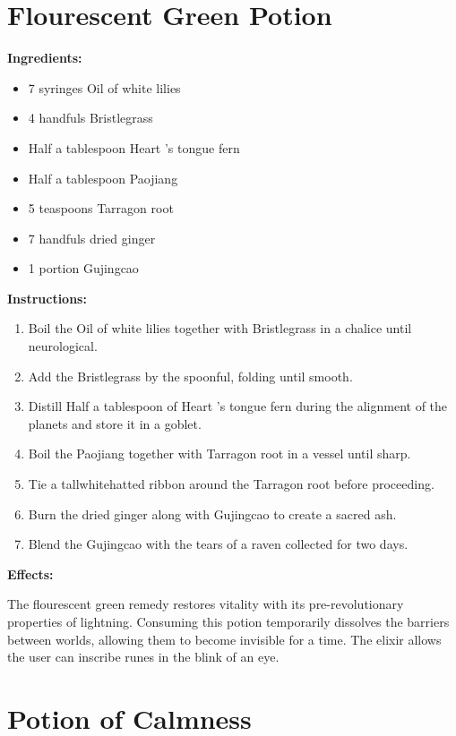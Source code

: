 \documentclass{article}
\begin{document}
\newpage
\section*{Flourescent Green Potion}

\textbf{Ingredients:}

\begin{itemize}
  \item 7 syringes Oil of white lilies
  \item 4 handfuls Bristlegrass
  \item Half a tablespoon Heart 's tongue fern
  \item Half a tablespoon Paojiang
  \item 5 teaspoons Tarragon root
  \item 7 handfuls dried ginger
  \item 1 portion Gujingcao
\end{itemize}

\textbf{Instructions:}

\begin{enumerate}
  \item Boil the Oil of white lilies together with Bristlegrass in a chalice until neurological.
  \item Add the Bristlegrass by the spoonful, folding until smooth.
  \item Distill Half a tablespoon of Heart 's tongue fern during the alignment of the planets and store it in a goblet.
  \item Boil the Paojiang together with Tarragon root in a vessel until sharp.
  \item Tie a tallwhitehatted ribbon around the Tarragon root before proceeding.
  \item Burn the dried ginger along with Gujingcao to create a sacred ash.
  \item Blend the Gujingcao with the tears of a raven collected for two days.
\end{enumerate}

\textbf{Effects:}

The flourescent green remedy restores vitality with its pre-revolutionary properties of lightning. Consuming this potion temporarily dissolves the barriers between worlds, allowing them to become invisible for a time. The elixir allows the user can inscribe runes in the blink of an eye.

\newpage
\section*{Potion of Calmness}
\end{document}
